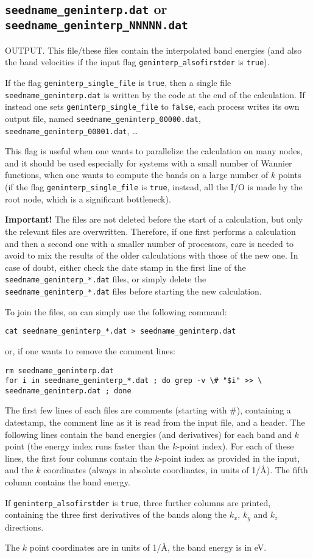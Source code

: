 \subsection{{\tt seedname\_geninterp.dat} or {\tt
    seedname\_geninterp\_NNNNN.dat}}
\label{sec:seedname.geninterp.dat}
OUTPUT. This file/these files contain the interpolated band energies (and also the band
velocities if the input flag \verb#geninterp_alsofirstder# is \verb#true#).

If the flag \verb|geninterp_single_file| is \verb|true|, then a single
file {\tt seedname\_geninterp.dat} is written by the code at the end
of the calculation. If instead one sets \verb|geninterp_single_file|
to \verb|false|, each process writes its own output file, named 
{\tt seedname\_geninterp\_00000.dat}, {\tt
  seedname\_geninterp\_00001.dat}, \ldots

This flag is useful when one wants to parallelize the calculation on
many nodes, and it should be used especially for systems with a small
number of Wannier functions, when one wants to compute the bands on a
large number of $k$ points (if the flag \verb|geninterp_single_file|
is \verb|true|, instead, all the I/O is made by the root node, which
is a significant bottleneck).

{\bf Important!} The files are not deleted before the start of a
calculation, but only the relevant files are overwritten. Therefore,
if one first performs a calculation and then a second one with a smaller
number of processors, care is needed to avoid to mix the results of
the older calculations with those of the new one. In case of doubt,
either check the date stamp in the first line of the {\tt
    seedname\_geninterp\_*.dat} files, or simply
delete the  {\tt
    seedname\_geninterp\_*.dat} files before starting the new
  calculation.

To join the files, on can simply use the following command:
\begin{verbatim}
cat seedname_geninterp_*.dat > seedname_geninterp.dat
\end{verbatim}
or, if one wants to remove the comment lines:
\begin{verbatim}
rm seedname_geninterp.dat
for i in seedname_geninterp_*.dat ; do grep -v \# "$i" >> \
seedname_geninterp.dat ; done
\end{verbatim}


The first few lines of each files are comments (starting with \#),
containing a datestamp, the
comment line as it is read from the input file, and a header.
The following lines contain the band energies (and
derivatives) for each band and $k$ point (the energy
index runs faster than the $k$-point index).
For each of these lines, the first four columns contain the $k$-point index as provided in the
input, and the $k$ coordinates (always in absolute coordinates, in
units of 1/\AA).
The fifth column contains the band energy.

If \verb#geninterp_alsofirstder# is \verb#true#, three further columns
are printed, containing the three first derivatives of the bands along the $k_x$, $k_y$
and $k_z$ directions.

The $k$ point coordinates are in units of 1/\AA, the band energy is in eV.




